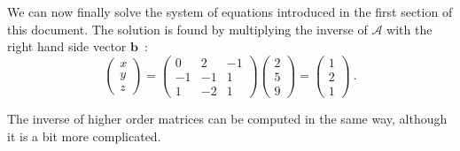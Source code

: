 We can now finally solve the system of equations introduced in the first section of this document.  The solution is
found by multiplying the inverse of $\mathcal{A}$ with the right hand side vector $\mathbf{b}$~:
\[
\begin{pmatrix}x\\ y\\ z\end{pmatrix}=\begin{pmatrix}0&2&-1\\ -1&-1&1\\ 1&-2&1\end{pmatrix}\begin{pmatrix}2\\ 5\\ 9\end{pmatrix}=
\begin{pmatrix}1\\ 2\\ 1\end{pmatrix}\ .
\]

\noindent The inverse of higher order matrices can be computed in the same way, although it is a bit more complicated.



